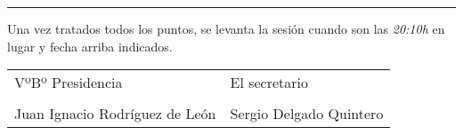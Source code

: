 \documentclass[a4paper,12pt]{article}
\begin{document}

\vspace{1cm}
\hrule
\vspace{3mm}

Una vez tratados todos los puntos, se levanta la sesión cuando son las \textit{20:10h} en lugar y fecha arriba indicados.

\vspace{1cm}

\begin{table}[h]
    \begin{tabular}{p{9cm}p{9cm}}
        VºBº Presidencia & El secretario \\
        \vspace{3cm} & \vspace{3cm} \\
        Juan Ignacio Rodríguez de León & Sergio Delgado Quintero \\
    \end{tabular}
\end{table}
\end{document}
